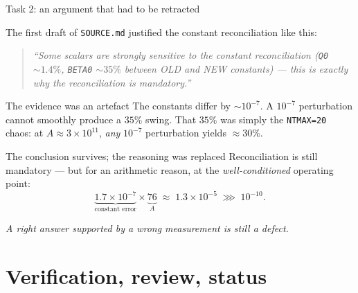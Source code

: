 \documentclass[10pt,aspectratio=169]{beamer}
\newcommand{\C}[1]{\texttt{\small #1}}          %
\begin{document}
\begin{frame}{Task 2: an argument that had to be retracted}

The first draft of \C{SOURCE.md} justified the constant reconciliation like this:

\begin{quote}
\small\itshape
``Some scalars are strongly sensitive to the constant reconciliation (\C{Q0} $\sim1.4\%$, \C{BETA0}
$\sim35\%$ between OLD and NEW constants) --- this is exactly why the reconciliation is mandatory.''
\end{quote}

\vspace{0.3em}
\begin{alertblock}{The evidence was an artefact}
The constants differ by $\sim 10^{-7}$. A $10^{-7}$ perturbation cannot smoothly produce a $35\%$ swing.
That $35\%$ was simply the \C{NTMAX=20} chaos: at $A \approx 3\times10^{11}$, \emph{any}
$10^{-7}$ perturbation yields $\approx 30\%$.
\end{alertblock}

\vspace{0.3em}
\begin{exampleblock}{The conclusion survives; the reasoning was replaced}
Reconciliation is still mandatory --- but for an arithmetic reason, at the \emph{well-conditioned} operating point:
\[
  \underbrace{1.7\times10^{-7}}_{\text{constant error}} \times \underbrace{76}_{A} \;\approx\; 1.3\times10^{-5}
  \;\ggg\; 10^{-10}.
\]
\end{exampleblock}

\vspace{0.2em}
\centerline{\small\emph{A right answer supported by a wrong measurement is still a defect.}}
\end{frame}

\section{Verification, review, status}
\end{document}

